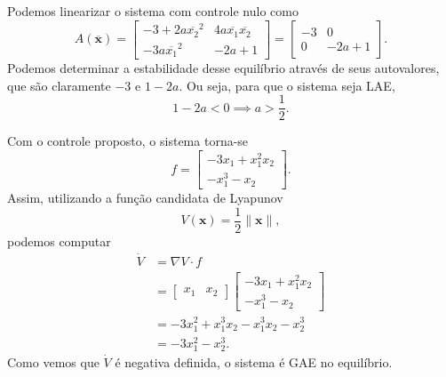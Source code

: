 \documentclass[a4paper]{report}
\begin{document}

Podemos linearizar o sistema com controle nulo como \[
    A(\bm{\overline{x}}) = \begin{bmatrix} 
	-3 +2a \overline{x_2}^2 & 4a\overline{x_1} \overline{x_2} \\
	-3a \overline{x_1}^2 & -2a +1
\end{bmatrix} = \begin{bmatrix} 
	-3 & 0 \\
	0 & -2a + 1
\end{bmatrix} 
.\] Podemos determinar a estabilidade desse equilíbrio através de seus autovalores, que são claramente $-3$ e $1-2a$. Ou seja, para que o sistema seja LAE,  \[
1-2a < 0 \implies a > \frac{1}{2}
.\] 


Com o controle proposto, o sistema torna-se \[
f = \begin{bmatrix} -3x_1 + x_1^2x_2 \\ -x_1^3 -x_2 \end{bmatrix} 
.\] Assim, utilizando a função candidata de Lyapunov \[
V\left( \bm{x} \right) = \frac{1}{2}\|\bm{x}\|
,\] podemos computar
\begin{align*}
\dot{V} &= \nabla V \cdot f \\
&= \begin{bmatrix} x_1 & x_2 \end{bmatrix} \begin{bmatrix} -3x_1 + x_1^2x_2 \\ -x_1^3 -x_2 \end{bmatrix} \\
&= -3x_1^2 + x_1^3x_2 -x_1^3x_2 -x_2^3 \\
&= -3x_1^2 -x_2^3
.\end{align*}
Como vemos que $\dot{V}$ é negativa definida, o sistema é GAE no equilíbrio.

\end{document}

